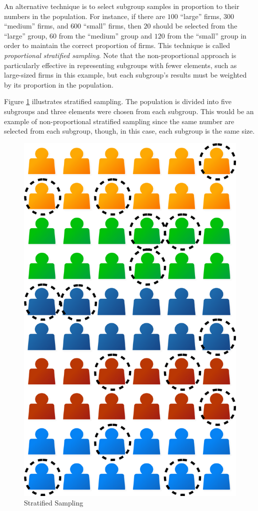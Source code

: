 An alternative technique is to select subgroup samples in proportion to their numbers in the population. For instance, if there are $ 100 $ ``large'' firms, $ 300 $ ``medium'' firms, and $ 600 $ ``small'' firms, then $ 20 $ should be selected from the ``large'' group, $ 60 $ from the ``medium'' group and $ 120 $ from the ``small'' group in order to maintain the correct proportion of firms. This technique is called \textit{proportional stratified sampling}. Note that the non-proportional approach is particularly effective in representing subgroups with fewer elements, such as large-sized firms in this example, but each subgroup's results must be weighted by its proportion in the population.

Figure \ref{07:fig04} illustrates stratified sampling. The population is divided into five subgroups and three elements were chosen from each subgroup. This would be an example of non-proportional stratified sampling since the same number are selected from each subgroup, though, in this case, each subgroup is the same size.

\begin{figure}[H]
	\centering
	\includegraphics[width=\maxwidth{.35\linewidth}]{gfx/07-04}
	\caption{Stratified Sampling}
	\label{07:fig04}
\end{figure}

